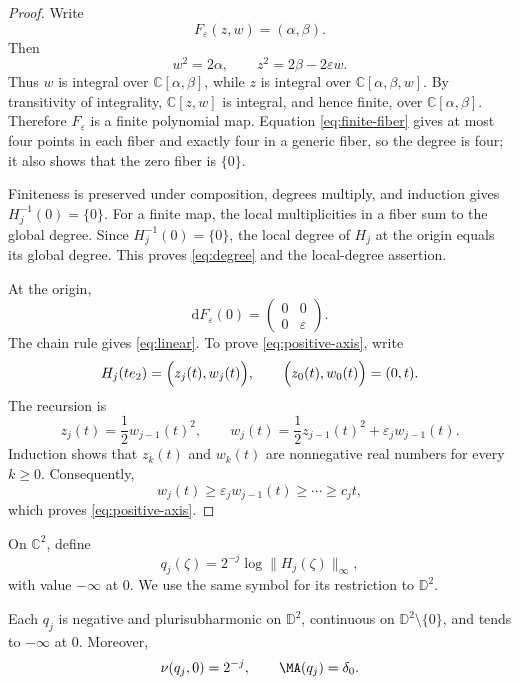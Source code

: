 \documentclass[11pt,a4paper]{article}
\begin{document}
\begin{proof}
Write
\[
  F_\varepsilon(z,w)=(\alpha,\beta).
\]
Then
\begin{equation}\label{eq:finite-fiber}
  w^2=2\alpha,\qquad z^2=2\beta-2\varepsilon w.
\end{equation}
Thus $w$ is integral over $\mathbb C[\alpha,\beta]$, while $z$ is integral over $\mathbb C[\alpha,\beta,w]$. By transitivity of integrality, $\mathbb C[z,w]$ is integral, and hence finite, over $\mathbb C[\alpha,\beta]$. Therefore $F_\varepsilon$ is a finite polynomial map. Equation \eqref{eq:finite-fiber} gives at most four points in each fiber and exactly four in a generic fiber, so the degree is four; it also shows that the zero fiber is $\{0\}$.

Finiteness is preserved under composition, degrees multiply, and induction gives $H_j^{-1}(0)=\{0\}$. For a finite map, the local multiplicities in a fiber sum to the global degree. Since $H_j^{-1}(0)=\{0\}$, the local degree of $H_j$ at the origin equals its global degree. This proves \eqref{eq:degree} and the local-degree assertion.

At the origin,
\[
  \mathrm dF_\varepsilon(0)= \begin{pmatrix}0&0\\0&\varepsilon\end{pmatrix}.
\]
The chain rule gives \eqref{eq:linear}. To prove \eqref{eq:positive-axis}, write
\[
  H_j(t e_2)=\Bigl(z_j(t),w_j(t)\Bigr),\qquad \Bigl(z_0(t),w_0(t)\Bigr)=(0,t).
\]
The recursion is
\[
  z_j(t)=\frac12 w_{j-1}(t)^2,
  \qquad
  w_j(t)=\frac12 z_{j-1}(t)^2+\varepsilon_j w_{j-1}(t).
\]
Induction shows that $z_k(t)$ and $w_k(t)$ are nonnegative real numbers for every $k\ge0$. Consequently,
\[
  w_j(t)\ge\varepsilon_j w_{j-1}(t)
  \ge\cdots\ge c_j t,
\]
which proves \eqref{eq:positive-axis}.
\end{proof}

On $\mathbb C^2$, define
\[
  q_j(\zeta)=2^{-j}\log\|H_j(\zeta)\|_\infty,
\]
with value $-\infty$ at $0$. We use the same symbol for its restriction to $\mathbb D^2$.

\begin{proposition}
Each $q_j$ is negative and plurisubharmonic on $\mathbb D^2$, continuous on $\mathbb D^2\setminus\{0\}$, and tends to $-\infty$ at $0$. Moreover,
\begin{equation}\label{eq:finite-invariants}
  \nu(q_j,0)=2^{-j}, \qquad \MA(q_j)=\delta_0.
\end{equation}
\end{proposition}
\end{document}
